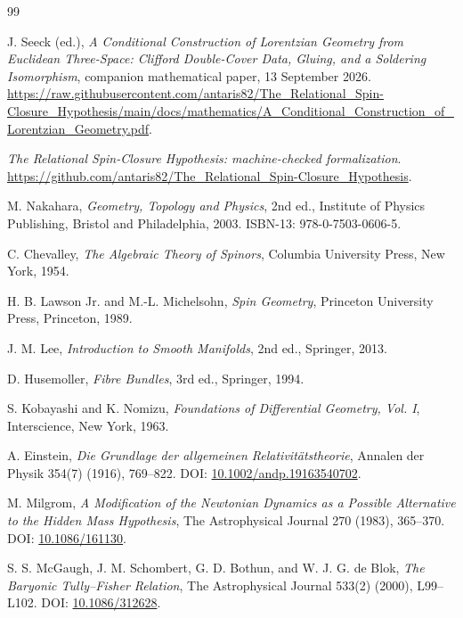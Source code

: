 \documentclass[11pt,a4paper]{article}
\theoremstyle{remark}
\begin{document}
\begin{thebibliography}{99}
\raggedright

J. Seeck (ed.),
\emph{A Conditional Construction of Lorentzian Geometry from Euclidean Three-Space: Clifford Double-Cover Data, Gluing, and a Soldering Isomorphism},
companion mathematical paper, 13 September 2026.
\url{https://raw.githubusercontent.com/antaris82/The_Relational_Spin-Closure_Hypothesis/main/docs/mathematics/A_Conditional_Construction_of_Lorentzian_Geometry.pdf}.

\emph{The Relational Spin-Closure Hypothesis: machine-checked formalization}.
\url{https://github.com/antaris82/The_Relational_Spin-Closure_Hypothesis}.

M. Nakahara,
\emph{Geometry, Topology and Physics}, 2nd ed.,
Institute of Physics Publishing, Bristol and Philadelphia, 2003.
ISBN-13: 978-0-7503-0606-5.

C. Chevalley,
\emph{The Algebraic Theory of Spinors},
Columbia University Press, New York, 1954.

H. B. Lawson Jr. and M.-L. Michelsohn,
\emph{Spin Geometry},
Princeton University Press, Princeton, 1989.

J. M. Lee,
\emph{Introduction to Smooth Manifolds}, 2nd ed.,
Springer, 2013.

D. Husemoller,
\emph{Fibre Bundles}, 3rd ed.,
Springer, 1994.

S. Kobayashi and K. Nomizu,
\emph{Foundations of Differential Geometry, Vol. I},
Interscience, New York, 1963.

A. Einstein,
\emph{Die Grundlage der allgemeinen Relativit\"atstheorie},
Annalen der Physik 354(7) (1916), 769--822.
DOI: \href{https://doi.org/10.1002/andp.19163540702}{10.1002/andp.19163540702}.

M. Milgrom,
\emph{A Modification of the Newtonian Dynamics as a Possible Alternative to the Hidden Mass Hypothesis},
The Astrophysical Journal 270 (1983), 365--370.
DOI: \href{https://doi.org/10.1086/161130}{10.1086/161130}.

S. S. McGaugh, J. M. Schombert, G. D. Bothun, and W. J. G. de Blok,
\emph{The Baryonic Tully--Fisher Relation},
The Astrophysical Journal 533(2) (2000), L99--L102.
DOI: \href{https://doi.org/10.1086/312628}{10.1086/312628}.


\end{thebibliography}
\end{document}
